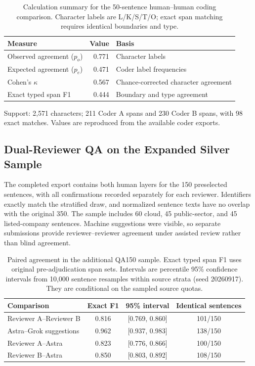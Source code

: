 \begin{table}[htbp]
\caption{Calculation summary for the 50-sentence human--human coding comparison. Character labels are L/K/S/T/O; exact span matching requires identical boundaries and type.}
\label{tab:iaa50}
\centering\small
\renewcommand{\arraystretch}{1.15}
\begin{tabularx}{\linewidth}{@{}LrL@{}}
\toprule
Measure & Value & Basis \\
\midrule
Observed agreement ($p_o$) & 0.771 & Character labels \\
Expected agreement ($p_e$) & 0.471 & Coder label frequencies \\
Cohen's $\kappa$ & 0.567 & Chance-corrected character agreement \\
Exact typed span F1 & 0.444 & Boundary and type agreement \\
\bottomrule
\end{tabularx}
\par\smallskip\footnotesize\RaggedRight
Support: 2,571 characters; 211 Coder A spans and 230 Coder B spans, with 98 exact matches. Values are reproduced from the available coder exports.
\end{table}
\FloatBarrier

\subsection{Dual-Reviewer QA on the Expanded Silver Sample}
The completed export contains both human layers for the 150 preselected sentences, with all confirmations recorded separately for each reviewer. Identifiers exactly match the stratified draw, and normalized sentence texts have no overlap with the original 350. The sample includes 60 cloud, 45 public-sector, and 45 listed-company sentences. Machine suggestions were visible, so separate submissions provide reviewer--reviewer agreement under assisted review rather than blind agreement.

\begin{table}[htbp]
\caption{Paired agreement in the additional QA150 sample. Exact typed span F1 uses original pre-adjudication span sets. Intervals are percentile 95\% confidence intervals from 10,000 sentence resamples within source strata (seed 20260917). They are conditional on the sampled source quotas.}
\label{tab:qa150-pairs}
\centering\small
\begin{tabularx}{\linewidth}{@{}Lccc@{}}
\toprule
Comparison & Exact F1 & 95\% interval & Identical sentences \\
\midrule
Reviewer A--Reviewer B & 0.816 & [0.769, 0.860] & 101/150 \\
Astra--Grok suggestions & 0.962 & [0.937, 0.983] & 138/150 \\
Reviewer A--Astra & 0.823 & [0.776, 0.866] & 100/150 \\
Reviewer B--Astra & 0.850 & [0.803, 0.892] & 108/150 \\
\bottomrule
\end{tabularx}
\end{table}

